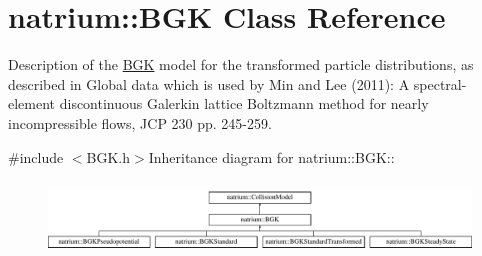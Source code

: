 \hypertarget{classnatrium_1_1BGK}{
\section{natrium::BGK Class Reference}
\label{classnatrium_1_1BGK}
}


Description of the \hyperlink{classnatrium_1_1BGK}{BGK} model for the transformed particle distributions, as described in Global data which is used by Min and Lee (2011): A spectral-\/element discontinuous Galerkin lattice Boltzmann method for nearly incompressible flows, JCP 230 pp. 245-\/259.  


{\ttfamily \#include $<$BGK.h$>$}Inheritance diagram for natrium::BGK::\begin{figure}[H]
\begin{center}
\leavevmode
\includegraphics[height=1.96262cm]{classnatrium_1_1BGK}
\end{center}
\end{figure}

